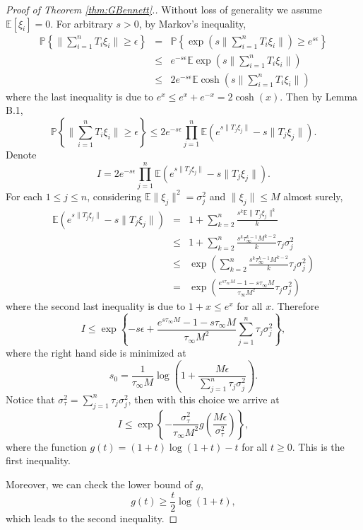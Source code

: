 \documentclass[twoside]{amsart}
\theoremstyle{theorem}
\theoremstyle{definition}
\theoremstyle{remark}
\def\P{{\mathbb P}}        %
\def\E{{\mathbb E}}        %
\begin{document}
\begin{proof}[Proof of Theorem \ref{thm:GBennett}.] Without loss of generality we assume $\E[\xi_i]=0$. For arbitrary $s>0$, by Markov's inequality,
\begin{eqnarray*}
\P \left\{ \|\sum_{i=1}^n T_i \xi_i \| \geq \epsilon \right\} & =  &\P \left\{ \exp\left(s \|\sum_{i=1}^n T_i \xi_i \|\right) \geq e^{s\epsilon} \right\} \\
& \leq & e^{-s \epsilon} \E \exp\left(s \|\sum_{i=1}^n T_i \xi_i \|\right) \\
& \leq & 2 e^{-s \epsilon} \E \cosh \left(s \|\sum_{i=1}^n T_i \xi_i \|\right)
\end{eqnarray*}
where the last inequality is due to $e^x \leq e^x + e^{-x}=2\cosh(x)$. Then by Lemma B.1,
\[ \P \left\{ \|\sum_{i=1}^n T_i \xi_i \| \geq \epsilon \right\} \leq 2 e^{-s \epsilon} \prod_{j=1}^n \E \left( e^{s \|T_j \xi_j\|} - s \|T_j \xi_j\| \right).\]
Denote
\[ I = 2 e^{-s \epsilon} \prod_{j=1}^n \E \left( e^{s \|T_j \xi_j\|} - s \|T_j \xi_j\| \right). \]
For each $1\leq j\leq n$, considering $\E\|\xi_j\|^2 = \sigma_j^2$ and $\|\xi_j\|\leq M$ almost surely,
\begin{eqnarray*}
\E \left( e^{s \|T_j \xi_j\|} - s \|T_j \xi_j\| \right) & = & 1 + \sum_{k=2}^n \frac{s^k \E \|T_j \xi_j\|^k}{k\!} \\
& \leq & 1 + \sum_{k=2}^n \frac{s^k \tau_\infty^{k-1} M^{k-2}}{k\!} \tau_j \sigma^2_j \\
& \leq & \exp\left(\sum_{k=2}^n \frac{s^k \tau_\infty^{k-1} M^{k-2}}{k\!} \tau_j \sigma^2_j\right) \\
& = & \exp\left( \frac{e^{s\tau_\infty M}-1-s\tau_\infty M}{\tau_\infty M^2} \tau_j \sigma^2_j \right)
\end{eqnarray*}
where the second last inequality is due to $1 + x \leq e^x$ for all $x$. Therefore
\[ I \leq \exp\left\{-s \epsilon +  \frac{e^{s\tau_\infty M}-1-s\tau_\infty M}{\tau_\infty M^2} \sum_{j=1}^n \tau_j \sigma^2_j \right\}, \]
where the right hand side is minimized at
\[ s_0 = \frac{1}{\tau_\infty M} \log \left( 1 + \frac{M\epsilon}{\sum_{j=1}^n \tau_j \sigma^2_j } \right) .\]
Notice that $\sigma^2_\tau =\sum_{j=1}^n \tau_j \sigma^2_j$, then with this choice we arrive at
\[ I \leq \exp \left\{ -\frac{\sigma^2_\tau}{\tau_\infty M^2} g\left(\frac{M\epsilon}{\sigma^2_\tau} \right)\right\}, \]
where the function $g(t)=(1+t)\log(1+t)-t$ for all $t\geq 0$. This is the first inequality.

Moreover, we can check the lower bound of $g$,
\[ g(t) \geq \frac{t}{2} \log(1+t), \]
which leads to the second inequality.
\end{proof}
\end{document}
